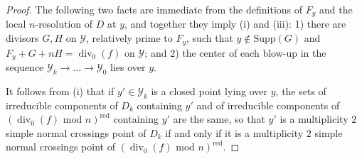 \documentclass[12pt]{amsart}
\numberwithin{equation}{section}
\theoremstyle{definition}
\newcommand{\Y}{\mathcal{Y}}
\newcommand{\tx}[1]{\text{#1}}
\DeclareMathOperator{\divi}{div}
\DeclareMathOperator{\red}{red}
\DeclareMathOperator{\mult}{mult}
\begin{document}
\begin{proof}
    The following two facts are immediate from the definitions of $F_y$ and the local $n$-resolution of $D$ at $y$, and together they imply (i) and (iii): 1) there are divisors $G,H$ on $\Y$, relatively prime to $F_y$, such that $y\not\in\tx{Supp}(G)$ and $F_y+G+nH=\divi_0(f)$ on $\Y$; and 2) the center of each blow-up in the sequence $\Y_k\to...\to\Y_0$ lies over $y$. %
    

    It follows from (i) that if $y'\in\Y_k$ is a closed point lying over $y$, the sets of irreducible components of $D_k$ containing $y'$ and of irreducible components of $(\divi_0(f)\tx{ mod }n)^\tx{red}$ containing $y'$ are the same, so that $y'$ is a multiplicity $2$ simple normal crossings point of $D_k$ if and only if it is a multiplicity $2$ simple normal crossings point of $(\divi_0(f)\tx{ mod }n)^\tx{red}$. 


\end{proof}
\end{document}
